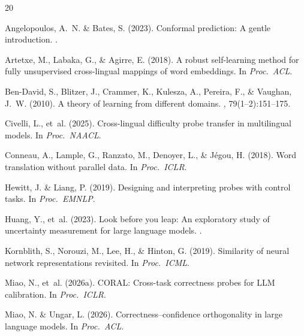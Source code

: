 \documentclass[11pt,a4paper]{article}
\begin{document}

\begin{thebibliography}{20}

Angelopoulos, A.~N. \& Bates, S. (2023).
\newblock Conformal prediction: A gentle introduction.
.

Artetxe, M., Labaka, G., \& Agirre, E. (2018).
\newblock A robust self-learning method for fully unsupervised cross-lingual mappings of word embeddings.
\newblock In {\em Proc.\ ACL}.

Ben-David, S., Blitzer, J., Crammer, K., Kulesza, A., Pereira, F., \& Vaughan, J.~W. (2010).
\newblock A theory of learning from different domains.
, 79(1--2):151--175.

Civelli, L., et~al. (2025).
\newblock Cross-lingual difficulty probe transfer in multilingual models.
\newblock In {\em Proc.\ NAACL}.

Conneau, A., Lample, G., Ranzato, M., Denoyer, L., \& J\'{e}gou, H. (2018).
\newblock Word translation without parallel data.
\newblock In {\em Proc.\ ICLR}.

Hewitt, J. \& Liang, P. (2019).
\newblock Designing and interpreting probes with control tasks.
\newblock In {\em Proc.\ EMNLP}.

Huang, Y., et~al. (2023).
\newblock Look before you leap: An exploratory study of uncertainty measurement for large language models.
.

Kornblith, S., Norouzi, M., Lee, H., \& Hinton, G. (2019).
\newblock Similarity of neural network representations revisited.
\newblock In {\em Proc.\ ICML}.

Miao, N., et~al. (2026a).
\newblock CORAL: Cross-task correctness probes for LLM calibration.
\newblock In {\em Proc.\ ICLR}.

Miao, N. \& Ungar, L. (2026).
\newblock Correctness--confidence orthogonality in large language models.
\newblock In {\em Proc.\ ACL}.


\end{thebibliography}
\end{document}
